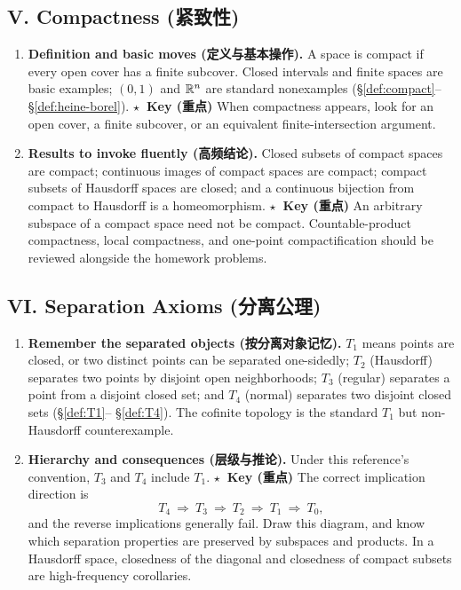 \documentclass{article}
\newcommand{\reviewkey}{\textcolor{red!65!black}{\textbf{\ensuremath{\star}\ Key (重点)}}}
\begin{document}
\subsection*{V. Compactness (紧致性)}

\begin{enumerate}
  \item \textbf{Definition and basic moves (定义与基本操作).} A space is compact
  if every open cover has a finite subcover. Closed intervals and finite spaces
  are basic examples; $(0,1)$ and $\mathbb{R}^n$ are standard nonexamples
  (\S\ref{def:compact}--\S\ref{def:heine-borel}). \reviewkey{} When
  compactness appears, look for an open cover, a finite subcover, or an
  equivalent finite-intersection argument.

  \item \textbf{Results to invoke fluently (高频结论).} Closed subsets of
  compact spaces are compact; continuous images of compact spaces are compact;
  compact subsets of Hausdorff spaces are closed; and a continuous bijection
  from compact to Hausdorff is a homeomorphism. \reviewkey{} An arbitrary
  subspace of a compact space need not be compact. Countable-product
  compactness, local compactness, and one-point compactification should be
  reviewed alongside the homework problems.
\end{enumerate}

\subsection*{VI. Separation Axioms (分离公理)}

\begin{enumerate}
  \item \textbf{Remember the separated objects (按分离对象记忆).} $T_1$ means
  points are closed, or two distinct points can be separated one-sidedly;
  $T_2$ (Hausdorff) separates two points by disjoint open neighborhoods;
  $T_3$ (regular) separates a point from a disjoint closed set; and $T_4$
  (normal) separates two disjoint closed sets (\S\ref{def:T1}--
  \S\ref{def:T4}). The cofinite topology is the standard $T_1$ but
  non-Hausdorff counterexample.

  \item \textbf{Hierarchy and consequences (层级与推论).} Under this
  reference's convention, $T_3$ and $T_4$ include $T_1$. \reviewkey{} The
  correct implication direction is
  \[
    T_4\ \Longrightarrow\ T_3\ \Longrightarrow\ T_2\ \Longrightarrow\ T_1\ \Longrightarrow\ T_0,
  \]
  and the reverse implications generally fail. Draw this diagram, and know
  which separation properties are preserved by subspaces and products. In a
  Hausdorff space, closedness of the diagonal and closedness of compact subsets
  are high-frequency corollaries.
\end{enumerate}
\end{document}
